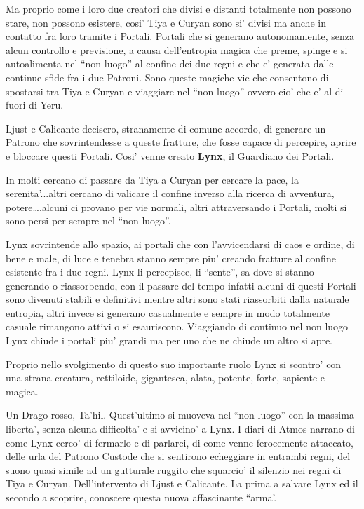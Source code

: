 \documentclass[a4paper,11pt,twoside,openany]{dndbook}
\begin{document}
{Ma proprio come i loro due creatori che divisi e distanti totalmente non possono stare, non possono esistere, cosi' Tiya e Curyan sono si' divisi ma anche in contatto fra loro tramite i Portali. Portali che si generano autonomamente, senza alcun controllo e previsione, a causa dell'entropia magica che preme, spinge e si autoalimenta nel ``non luogo'' al confine dei due regni e che e' generata dalle continue sfide fra i due Patroni. Sono queste magiche vie che consentono di spostarsi tra Tiya e Curyan e viaggiare nel ``non luogo'' ovvero cio' che e' al di fuori di Yeru.

Ljust e Calicante decisero, stranamente di comune accordo, di generare un Patrono che sovrintendesse a queste fratture, che fosse capace di percepire, aprire e bloccare questi Portali. Cosi' venne creato \textbf{Lynx}, il Guardiano dei Portali.

In molti cercano di passare da Tiya a Curyan per cercare la pace, la serenita'...altri cercano di valicare il confine inverso alla ricerca di avventura, potere\ldots .alcuni ci provano per vie normali, altri attraversando i Portali, molti si sono persi per sempre nel ``non luogo''.

Lynx sovrintende allo spazio, ai portali che con l'avvicendarsi di caos e ordine, di bene e male, di luce e tenebra stanno sempre piu' creando fratture al confine esistente fra i due regni. Lynx li percepisce, li ``sente'', sa dove si stanno generando o riassorbendo, con il passare del tempo infatti alcuni di questi Portali sono divenuti stabili e definitivi mentre altri sono stati riassorbiti dalla naturale entropia, altri invece si generano casualmente e sempre in modo totalmente casuale rimangono attivi o si esauriscono. Viaggiando di continuo nel non luogo Lynx chiude i portali piu' grandi ma per uno che ne chiude un altro si apre.

Proprio nello svolgimento di questo suo importante ruolo Lynx si scontro' con una strana creatura, rettiloide, gigantesca, alata, potente, forte, sapiente e magica.

Un Drago rosso, Ta'hil. Quest'ultimo si muoveva nel ``non luogo'' con la massima liberta', senza alcuna difficolta' e si avvicino' a Lynx. I diari di Atmos narrano di come Lynx cerco' di fermarlo e di parlarci, di come venne ferocemente attaccato, delle urla del Patrono Custode che si sentirono echeggiare in entrambi regni, del suono quasi simile ad un gutturale ruggito che squarcio' il silenzio nei regni di Tiya e Curyan. Dell'intervento di Ljust e Calicante. La prima a salvare Lynx ed il secondo a scoprire, conoscere questa nuova affascinante ``arma'.

}
\end{document}

